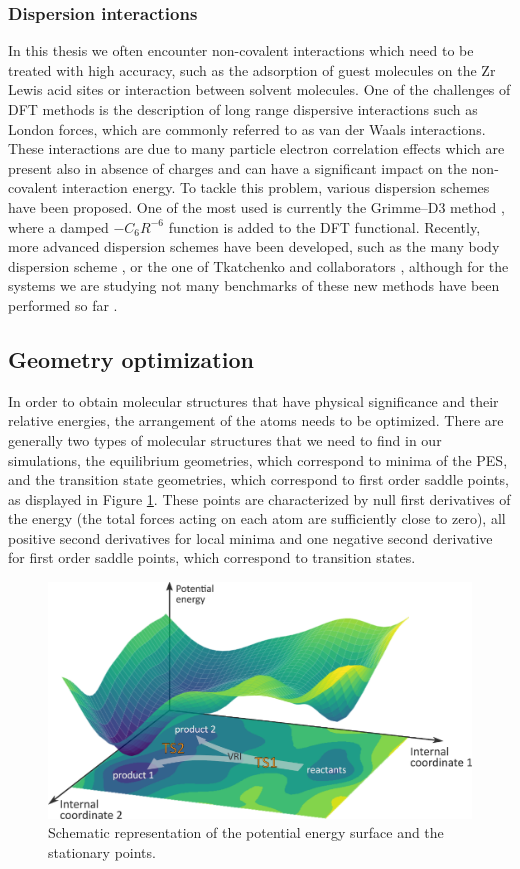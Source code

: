 \subsubsection*{Dispersion interactions}
In this thesis we often encounter non-covalent interactions which need to be treated with high accuracy, such as the adsorption of guest molecules on the Zr Lewis acid sites or interaction between solvent molecules. One of the challenges of DFT methods is the description of long range dispersive interactions such as London forces, which are commonly referred to as van der Waals interactions. These interactions are due to many particle electron correlation effects which are present also in absence of charges and can have a significant impact on the non-covalent interaction energy. To tackle this problem, various dispersion schemes have been proposed. One of the most used is currently the Grimme--D3 method \cite{Grimme2010}, where a damped $-C_{6}R^{-6}$ function is added to the DFT functional. Recently, more advanced dispersion schemes have been developed, such as the many body dispersion scheme \cite{Buko2016}, or the one of Tkatchenko and collaborators \cite{Ambrosetti2014}, although for the systems we are studying not many benchmarks of these new methods have been performed so far  \cite{Wieme2018}.

\subsection*{Geometry optimization}
In order to obtain molecular structures that have physical significance and their relative energies, the arrangement of the atoms needs to be optimized. There are generally two types of molecular structures that we need to find in our simulations, the equilibrium geometries, which correspond to minima of the PES, and the transition state geometries, which correspond to first order saddle points, as displayed in Figure \ref{fig:FES1}. These points are characterized by null first derivatives of the energy (the total forces acting on each atom are sufficiently close to zero), all positive second derivatives for local minima and one negative second derivative for first order saddle points, which correspond to transition states. 

\begin{figure}[!htbp]
	\centering
 	\includegraphics[width=1.0\textwidth]{FES1}
	\caption{Schematic representation of the potential energy surface and the stationary points.}
	\label{fig:FES1}
\end{figure}

